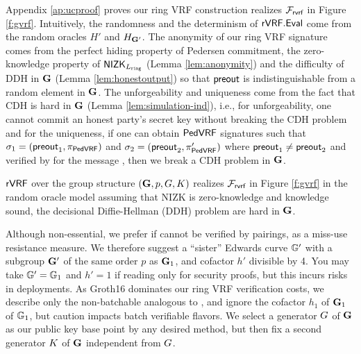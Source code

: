 Appendix \ref{ap:ucproof} proves our ring VRF construction realizes $ \mathcal{F}_{\textsf{rvrf}} $ in Figure \ref{f:gvrf}. Intuitively, the randomness and the determinism of $ {\mathsf{rVRF}}.{\mathsf{Eval}} $ come from the random oracles $ H' $ and $ H_{{\mathbf{G}}'} $.  The anonymity of our ring VRF signature comes from the perfect hiding property of Pedersen commitment, the zero-knowledge property of $ {\mathsf{NIZK}}_{L_{\mathtt{ring}}} $ (Lemma \ref{lem:anonymity}) and the difficulty of DDH in  $ {\mathbf{G}} $ (Lemma \ref{lem:honestoutput}) so that $ {\mathsf{preout}} $ is indistinguishable from a random element in $ {\mathbf{G}} $. The unforgeability and uniqueness come from the fact that CDH is hard in $ {\mathbf{G}} $ (Lemma \ref{lem:simulation-ind}), i.e., for unforgeability,  one cannot commit an honest party's secret key without breaking the CDH problem and for the uniqueness,  if one can obtain $ {\mathsf{PedVRF}} $ signatures such that $ \sigma_1 = ({\mathsf{preout}}_1, \pi_{{\mathsf{PedVRF}}}) $ and $ \sigma_2 = ({\mathsf{preout}}_2, \pi'_{{\mathsf{PedVRF}}}) $ where  $ {\mathsf{preout}}_1 \neq {\ensuremath{\mathsf{preout}}}_2 $  and verified by \compk for the message \msg, then we break a CDH problem in $ {\mathbf{G}} $.

\begin{theorem}\label{thm:rvrfmain}
$ {\mathsf{rVRF}} $  over the group structure $ ({\mathbf{G}},p,G,K) $ realizes $ \mathcal{F}_{\textsf{rvrf}} $ in Figure \ref{f:gvrf} in the random oracle model assuming that NIZK is zero-knowledge and knowledge sound, the decisional Diffie-Hellman (DDH) problem are hard in $ {\mathbf{G}}  $. 
\end{theorem}



Although non-essential, we prefer if \PreOut cannot be verified
by pairings, as a miss-use resistance measure.
We therefore suggest a ``sister'' Edwards curve ${\mathbb{G}}'$ with
a subgroup ${\mathbf{G}}'$ of the same order $p$ as ${\mathbf{G}}_1$,
and cofactor $h'$ divisible by 4.
You may take ${\mathbb{G}}' = {\mathbb{G}}_1$ and $h' = 1$ if reading only for
security proofs, but this incurs risks in deployments.
%
As Groth16 dominates our ring VRF verification costs, we describe only
the non-batchable \PedVRF analogous to \cite{nsec5,VXEd25519,draft-irtf-cfrg-vrf-10},
and ignore the cofactor $h_1$ of ${\mathbf{G}}_1$ of ${\mathbb{G}}_1$, 
but caution \cite{HdVBatchEd25519} impacts batch verifiable flavors.
%
We select a generator $G$ of ${\mathbf{G}}$ as our public key base point
by any desired method, but then
fix a second generator $K$ of ${\mathbf{G}}$ independent from $G$.



